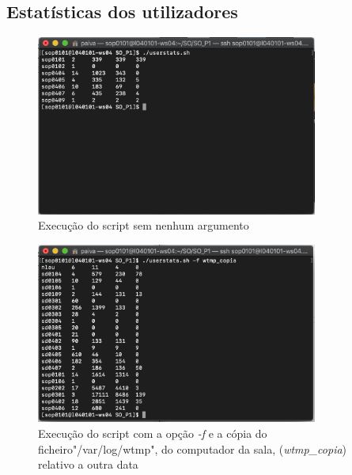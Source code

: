\documentclass[10pt,portuguese]{article}
\begin{document}
\subsection{Estatísticas dos utilizadores}
\begin{figure}[!h]
    \centering
    \includegraphics[width=350]{Resultados/normal.png}
    \caption{Execução do script sem nenhum argumento}
\end{figure}

\begin{figure}[!h]
    \centering
    \includegraphics[width=350]{Resultados/-f.png}
    \caption{Execução do script com a opção \textit{-f} e a cópia do ficheiro"/var/log/wtmp", do computador da sala, (\textit{wtmp\_copia}) relativo a outra data }
\end{figure}
\end{document}
